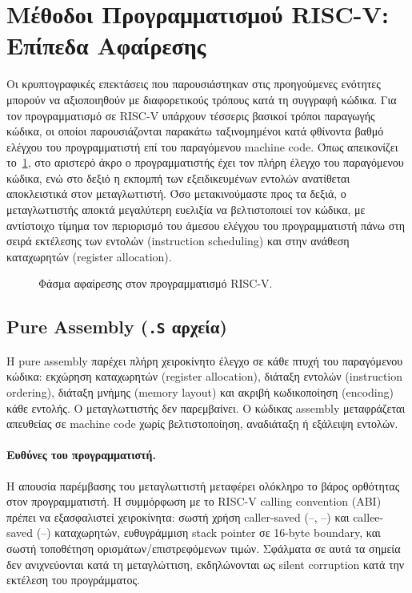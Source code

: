 \section{Μέθοδοι Προγραμματισμού RISC-V: Επίπεδα Αφαίρεσης}
\label{sec:programming-methods}

Οι κρυπτογραφικές επεκτάσεις που παρουσιάστηκαν στις προηγούμενες ενότητες
μπορούν να αξιοποιηθούν με διαφορετικούς τρόπους κατά τη συγγραφή κώδικα.
Για τον προγραμματισμό σε RISC-V υπάρχουν τέσσερις βασικοί τρόποι παραγωγής
κώδικα, οι οποίοι παρουσιάζονται παρακάτω ταξινομημένοι κατά φθίνοντα βαθμό
ελέγχου του προγραμματιστή επί του παραγόμενου machine code. Όπως
απεικονίζει το~\cref{fig:programming-spectrum}, στο αριστερό άκρο ο
προγραμματιστής έχει τον πλήρη έλεγχο του παραγόμενου κώδικα, ενώ στο δεξιό
η εκπομπή των εξειδικευμένων εντολών ανατίθεται αποκλειστικά στον
μεταγλωττιστή. Όσο μετακινούμαστε προς τα δεξιά, ο μεταγλωττιστής αποκτά
μεγαλύτερη ευελιξία να βελτιστοποιεί τον κώδικα, με αντίστοιχο τίμημα τον
περιορισμό του άμεσου ελέγχου του προγραμματιστή πάνω στη σειρά εκτέλεσης
των εντολών (instruction scheduling) και στην ανάθεση καταχωρητών
(register allocation).

\begin{figure}[htbp]
  \centering
  
  \caption{Φάσμα αφαίρεσης στον προγραμματισμό RISC-V.}
  \label{fig:programming-spectrum}
\end{figure}

\subsection{Pure Assembly (\texttt{.S} αρχεία)}
\label{ssec:pure-assembly}

Η pure assembly παρέχει πλήρη χειροκίνητο έλεγχο σε κάθε πτυχή του
παραγόμενου κώδικα: εκχώρηση καταχωρητών (register allocation), διάταξη
εντολών (instruction ordering), διάταξη μνήμης (memory layout) και ακριβή
κωδικοποίηση (encoding) κάθε εντολής. Ο μεταγλωττιστής δεν παρεμβαίνει. Ο
κώδικας assembly μεταφράζεται απευθείας σε machine code χωρίς
βελτιστοποίηση, αναδιάταξη ή εξάλειψη εντολών.

\paragraph{Ευθύνες του προγραμματιστή.}
Η απουσία παρέμβασης του μεταγλωττιστή μεταφέρει ολόκληρο το βάρος ορθότητας στον
προγραμματιστή. Η συμμόρφωση με το RISC-V calling convention (ABI)~\autocite{RISCV-psABI}
πρέπει να εξασφαλιστεί χειροκίνητα: σωστή χρήση caller-saved (–,
–) και callee-saved (–) καταχωρητών,
ευθυγράμμιση stack pointer σε 16-byte boundary, και σωστή τοποθέτηση
ορισμάτων/επιστρεφόμενων τιμών. Σφάλματα σε αυτά τα σημεία δεν ανιχνεύονται
κατά τη μεταγλώττιση, εκδηλώνονται ως silent corruption κατά την εκτέλεση του προγράμματος.

